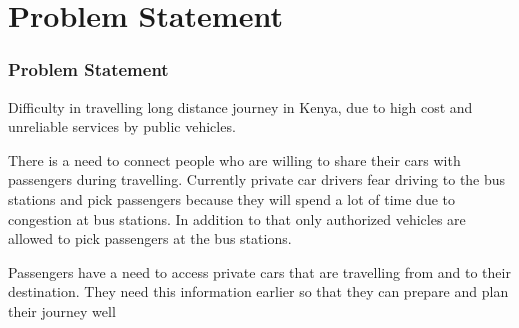 \section[Problem Statement]{Problem Statement}
\begin{frame}[allowframebreaks]
    \frametitle{Problem Statement}

    Difficulty in travelling long distance journey in Kenya, due to high cost and unreliable services by public vehicles.

    There is a need to connect people who are willing to share their cars with
    passengers during travelling. Currently private car drivers fear driving to the    bus stations and pick passengers because they will spend a lot of time due to    congestion at bus stations.    In addition to that only authorized vehicles are    allowed to pick passengers at the bus stations.

    Passengers have a need to access private cars that are travelling from and to     their destination. They need this information earlier so that they can prepare     and plan their journey well


\end{frame}